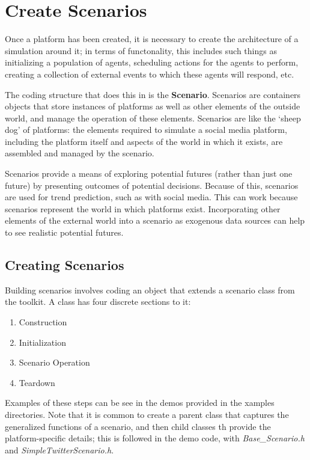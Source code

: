 
\chapter{Create Scenarios} \label{chap:CreateScenarios}
\par Once a platform has been created, it is necessary to create the architecture of a simulation around it; in terms of functonality, this includes such things as initializing a population of agents, scheduling actions for the agents to perform, creating a collection of external events to which these agents will respond, etc.

The coding structure that does this in \rhpc is the \textbf{Scenario}. Scenarios are containers objects that store instances of platforms as well as other elements of the outside world, and manage the operation of these elements. Scenarios are like the `sheep dog' of platforms: the elements required to simulate a social media platform, including the platform itself and aspects of the world in which it exists, are assembled and managed by the scenario. 

\par Scenarios provide a means of exploring potential futures (rather than just one future) by presenting outcomes of potential decisions. Because of this, scenarios are used for trend prediction, such as with social media. This can work because scenarios represent the world in which platforms exist.
Incorporating other elements of the external world into a scenario as exogenous data sources can help to see realistic potential futures.

\section{Creating Scenarios}
Building scenarios involves coding an object that extends a scenario class from the \rhpc toolkit. A class has four discrete sections to it:
\begin{enumerate}
	\item Construction 
	\item Initialization 
	\item Scenario Operation 
	\item Teardown
\end{enumerate}

Examples of these steps can be see in the demos provided in the xamples directories. Note that it is common to create a parent class that captures the generalized functions of a scenario, and then child classes th provide the platform-specific details; this is followed in the demo code, with \textit{Base\_Scenario.h} and \textit{SimpleTwitterScenario.h}.


